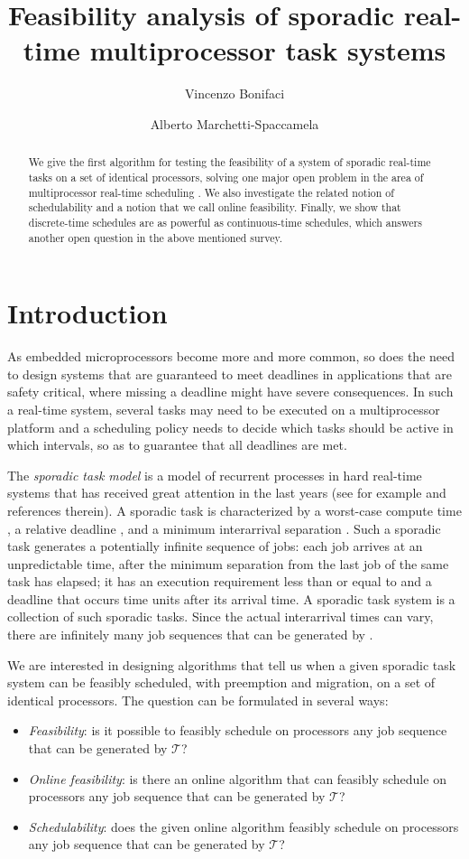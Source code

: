 \documentclass{llncs}
\title{Feasibility analysis of sporadic real-time multiprocessor task systems}
\author{Vincenzo Bonifaci\inst{1} \and Alberto Marchetti-Spaccamela\inst{2}}
\institute{Max-Planck Institut f\"ur Informatik, Saarbr\"ucken, Germany \\
\email{bonifaci@mpi-inf.mpg.de}
\and
Sapienza Universit\`a di Roma, Rome, Italy \\
\email{alberto@dis.uniroma1.it}}
\newcommand{\tsys}{\ensuremath{\mathcal{T}}}
\begin{document}
\maketitle
\begin{abstract}
We give the first algorithm for testing the feasibility of a system of sporadic real-time tasks on a set of identical processors, solving one major open problem in the area of multiprocessor real-time scheduling \cite{Baruah:2009:open}. We also investigate the related notion of schedulability and a notion that we call online feasibility. Finally, we show that discrete-time schedules are as powerful as continuous-time schedules, which answers another open question in the above mentioned survey. 
\end{abstract}


\section{Introduction}


As embedded microprocessors become more and more common, so does the need to design systems that are guaranteed to meet deadlines in applications that are safety critical, where missing a deadline might have severe consequences. In such a real-time system, several tasks may need to be executed on a multiprocessor platform and a scheduling policy needs to decide which tasks should be active in which intervals, so as to guarantee that all deadlines are met. 

The \emph{sporadic task model} is a model of recurrent processes in hard real-time systems that has received great attention in the last years (see for example \cite{Baker:2007,Baruah:2009:open} and references therein). A sporadic task  is characterized by a worst-case compute time , a relative deadline , and a minimum interarrival separation . Such a sporadic task generates a potentially infinite sequence of jobs: each job arrives at an unpredictable time, after the minimum separation  from the last job of the same task has elapsed; it has an execution requirement less than or equal to  and a deadline that occurs  time units after its arrival time. 
A sporadic task system  is a collection of such sporadic tasks. Since the actual interarrival times can vary, there are infinitely many job sequences that can be generated by . 

We are interested in designing algorithms that tell us when a given sporadic task system can be feasibly scheduled, with preemption and migration, on a set of  identical processors. The question can be formulated in several ways: 
\begin{itemize}
\item \emph{Feasibility}: is it possible to feasibly schedule on  processors any job sequence that can be generated by \tsys?  
\item \emph{Online feasibility}: is there an online algorithm that can feasibly schedule on  processors any job sequence that can be generated by \tsys? 
\item \emph{Schedulability}: does the given online algorithm  feasibly schedule on  processors any job sequence that can be generated by \tsys? 
\end{itemize}
\end{document}

